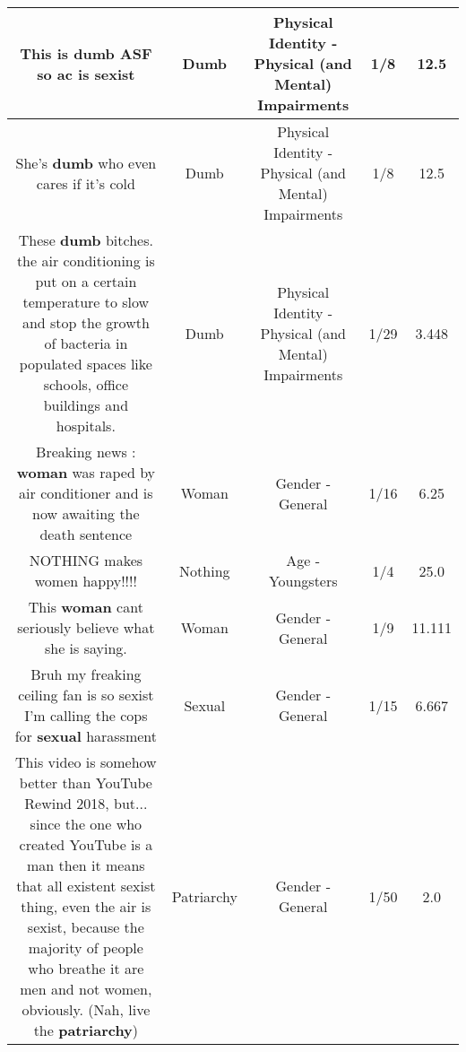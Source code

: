 \documentclass[11pt]{article}
\newlength\mylength
\begin{document}
\begin{center}
\begin{longtable}{|C{.65\mylength}|C{.30\mylength}|C{.12\mylength}|C{.12\mylength}|C{.12\mylength}|}
  \small This is \textbf{dumb} ASF so ac is sexist\normalsize   & Dumb & Physical Identity - Physical (and Mental) Impairments & 1/8 & 12.5 \\  \hline
  \small She's \textbf{dumb} who even cares if it's cold\normalsize   & Dumb & Physical Identity - Physical (and Mental) Impairments & 1/8 & 12.5 \\  \hline
  \small These \textbf{dumb} bitches. the air conditioning is put on a certain temperature to slow and stop the growth of bacteria in populated spaces like schools, office buildings and hospitals.\normalsize   & Dumb & Physical Identity - Physical (and Mental) Impairments & 1/29 & 3.448 \\  \hline
  \small Breaking news : \textbf{woman} was raped by air conditioner and is now awaiting the death sentence\normalsize   & Woman & Gender - General & 1/16 & 6.25 \\  \hline
  \small NOTHING makes women happy!!!!\normalsize   & Nothing & Age - Youngsters & 1/4 & 25.0 \\  \hline
  \small This \textbf{woman} cant seriously believe what she is saying.\normalsize   & Woman & Gender - General & 1/9 & 11.111 \\  \hline
  \small Bruh my freaking ceiling fan is so sexist I'm calling the cops for \textbf{sexual} harassment\normalsize   & Sexual & Gender - General & 1/15 & 6.667 \\  \hline
  \small This video is somehow better than YouTube Rewind 2018, but... since the one who created YouTube is a man then it means that all existent sexist thing, even the air is sexist, because the majority of people who breathe it are men and not women, obviously. (Nah, live the \textbf{patriarchy})\normalsize   & Patriarchy & Gender - General & 1/50 & 2.0 \\  \hline

\end{longtable}
\end{center}
\end{document}
